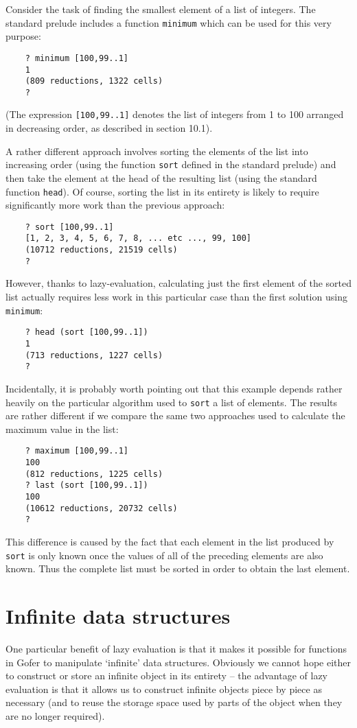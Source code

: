 Consider the task  of  finding  the  smallest  element  of  a  list  of
integers.  The standard prelude includes a function \verb"minimum" which can
be used for this very purpose:
\begin{verbatim}
    ? minimum [100,99..1]
    1
    (809 reductions, 1322 cells)
    ?
\end{verbatim}
(The expression \verb"[100,99..1]" denotes the list of integers from 1 to  100
arranged in decreasing order, as described in section 10.1).

A rather different approach involves sorting the elements of  the  list
into increasing  order  (using  the  function  \verb"sort"  defined  in  the
standard prelude) and  then  take  the  element  at  the  head  of  the
resulting list  (using  the  standard  function  \verb"head").   Of  course,
sorting the list in its entirety is  likely  to  require  significantly
more work than the previous approach:
\begin{verbatim}
    ? sort [100,99..1]
    [1, 2, 3, 4, 5, 6, 7, 8, ... etc ..., 99, 100]
    (10712 reductions, 21519 cells)
    ?
\end{verbatim}
However, thanks to lazy-evaluation, calculating just the first  element
of the sorted list actually requires less work in this particular  case
than the first solution using \verb"minimum":
\begin{verbatim}
    ? head (sort [100,99..1])
    1
    (713 reductions, 1227 cells)
    ?
\end{verbatim}
Incidentally, it is  probably worth  pointing  out  that  this  example
depends rather heavily on the particular algorithm  used  to  \verb"sort"  a
list of elements.  The results are rather different if we  compare  the
same two approaches used to calculate the maximum value in the list:
\begin{verbatim}
    ? maximum [100,99..1]
    100
    (812 reductions, 1225 cells)
    ? last (sort [100,99..1])
    100
    (10612 reductions, 20732 cells)
    ?
\end{verbatim}
This difference is caused by the fact that each  element  in  the  list
produced by \verb"sort" is  only  known  once  the  values  of  all  of  the
preceding elements are also known.  Thus  the  complete  list  must  be
sorted in order to obtain the last element.


\section{Infinite data structures}
One particular benefit of lazy evaluation is that it makes it  possible
for functions  in  Gofer  to  manipulate  `infinite'  data  structures.
Obviously we cannot hope either to   construct  or  store  an  infinite
object in its entirety -- the advantage of lazy evaluation is  that  it
allows us to construct infinite objects piece  by  piece  as  necessary
(and to reuse the storage space used by parts of the object  when  they
are no longer required).

